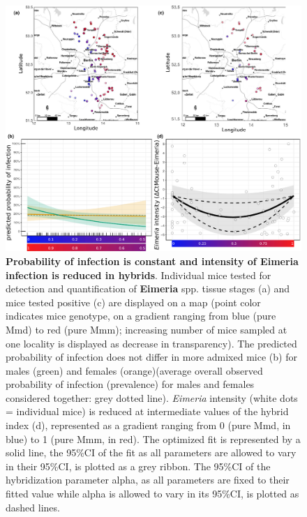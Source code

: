 \begin{figure}[H]
    \centering
    \includegraphics[width=\linewidth,height=\textheight,keepaspectratio]{images/2article1/Figure2.pdf}
    \caption{\textbf{Probability of infection is constant and intensity of \textbf{Eimeria} infection is reduced in hybrids}. Individual mice tested for detection and quantification of \textbf{Eimeria} spp. tissue stages (a) and mice tested positive (c) are displayed on a map (point color indicates mice genotype, on a gradient ranging from blue (pure Mmd) to red (pure Mmm); increasing number of mice sampled at one locality is displayed as decrease in transparency). The predicted probability of infection does not differ in more admixed mice (b) for males (green) and females (orange)(average overall observed probability of infection (prevalence) for males and females considered together: grey dotted line). \textit{Eimeria} intensity (white dots = individual mice) is reduced at intermediate values of the hybrid index (d), represented as a gradient ranging from 0 (pure Mmd, in blue) to 1 (pure Mmm, in red). The optimized fit is represented by a solid line, the 95\%CI of the fit as all parameters are allowed to vary in their 95\%CI, is plotted as a grey ribbon. The 95\%CI of the hybridization parameter alpha, as all parameters are fixed to their fitted value while alpha is allowed to vary in its 95\%CI, is plotted as dashed lines.}
\end{figure}

